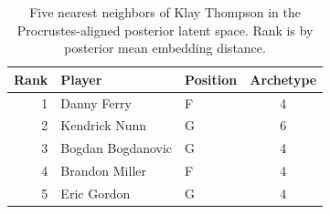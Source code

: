 \begin{table}[htbp]
  \centering\small
  \begin{tabular}{rllc}
    \toprule
    Rank & Player & Position & Archetype \\
    \midrule
    1 & Danny Ferry & F & 4 \\
    2 & Kendrick Nunn & G & 6 \\
    3 & Bogdan Bogdanovic & G & 4 \\
    4 & Brandon Miller & F & 4 \\
    5 & Eric Gordon & G & 4 \\
    \bottomrule
  \end{tabular}
  \caption{Five nearest neighbors of Klay Thompson in the Procrustes-aligned posterior latent space. Rank is by posterior mean embedding distance.}
  \label{tab:Klay_Thompson_neighbors}
\end{table}

